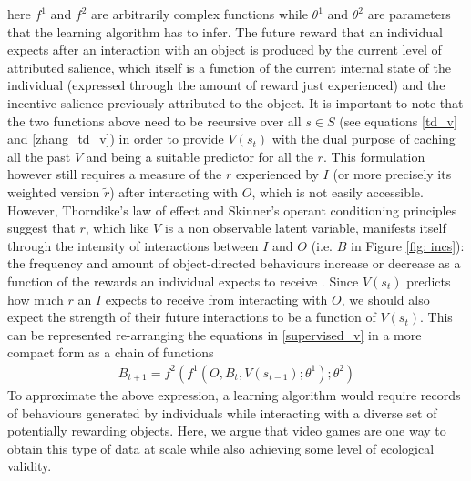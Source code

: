 here $f^{1}$ and $f^{2}$ are arbitrarily complex functions while $\theta^{1}$ and $\theta^{2}$ are parameters that the learning algorithm has to infer. The future reward that an individual expects after an interaction with an object is produced by the current level of attributed salience, which  itself is a function of the current internal state of the individual (expressed through the amount of reward just experienced) and the incentive salience previously attributed to the object. It is important to note that the two functions above need to be recursive over all $s \in S$ (see equations \ref{td_v} and \ref{zhang_td_v}) in order to provide $V(s_{t})$ with the dual purpose of caching all the past $V$ and being a suitable predictor for all the $r$. This formulation however still requires a measure of the $r$ experienced by $I$ (or more precisely its weighted version $\tilde{r}$) after interacting with $O$, which is not easily accessible. However, Thorndike's law of effect \cite{thorndike1927law} and Skinner's operant conditioning principles \cite{skinner1965science} suggest that $r$, which  like $V$ is a non observable latent variable, manifests itself through the intensity of interactions between $I$ and $O$ (i.e. $B$ in Figure \ref{fig: incs}): the frequency and amount of object-directed behaviours increase or decrease as a function of the rewards an individual expects to receive \cite{berridge2004motivation,schultz2017reward}. Since $V(s_{t})$ predicts how much $r$ an $I$ expects to receive from interacting with $O$, we should also expect the strength of their future interactions to be a function of $V(s_{t})$. This can be represented re-arranging the equations in \ref{supervised_v} in a more compact form as a chain of functions
\begin{align}
\label{supervised_b}
    B_{t+1} = f^{2}(f^{1}(O, B_{t}, V(s_{t-1}); \theta^{1});  \theta^{2})
\end{align}
To approximate the above expression, a learning algorithm would require records of behaviours generated by individuals while interacting with a diverse set of potentially rewarding objects. Here, we argue that video games are one way to obtain this type of data at scale while also achieving some level of ecological validity.

